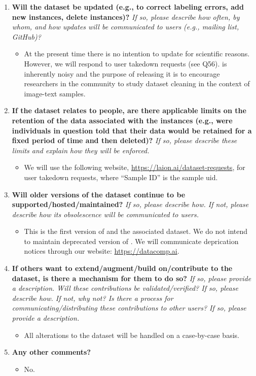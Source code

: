 \begin{enumerate}[label=Q\arabic*]
\item \textbf{Will the dataset be updated (e.g., to correct labeling errors, add new instances, delete instances)?} \textit{If so, please describe how often, by whom, and how updates will be communicated to users (e.g., mailing list, GitHub)?}

\begin{itemize}
\item At the present time there is no intention to update \pool for scientific reasons. However, we will respond to user takedown requests (see Q56). \pool is inherently noisy and the purpose of releasing it is to encourage researchers in the community to study dataset cleaning in the context of image-text samples.
\end{itemize}

\item \textbf{If the dataset relates to people, are there applicable limits on the retention of the data associated with the instances (e.g., were individuals in question told that their data would be retained for a fixed period of time and then deleted)?} \textit{If so, please describe these limits and explain how they will be enforced.}

\begin{itemize}
\item We will use the following website, \url{ https://laion.ai/dataset-requests}, for user takedown requests, where ``Sample ID'' is the sample uid.
\end{itemize}

\item \textbf{Will older versions of the dataset continue to be supported/hosted/maintained?} \textit{If so, please describe how. If not, please describe how its obsolescence will be communicated to users.}

\begin{itemize}
\item This is the first version of \datanet and the associated \pool dataset. We do not intend to maintain deprecated version of \pool. We will communicate deprication notices through our website: \url{https://datacomp.ai}.
\end{itemize}

\item \textbf{If others want to extend/augment/build on/contribute to the dataset, is there a mechanism for them to do so?} \textit{If so, please provide a description. Will these contributions be validated/verified? If so, please describe how. If not, why not? Is there a process for communicating/distributing these contributions to other users? If so, please provide a description.}

\begin{itemize}
\item All alterations to the dataset will be handled on a case-by-case basis.
\end{itemize}

\item \textbf{Any other comments?}

\begin{itemize}
\item No.
\end{itemize}

\end{enumerate}

